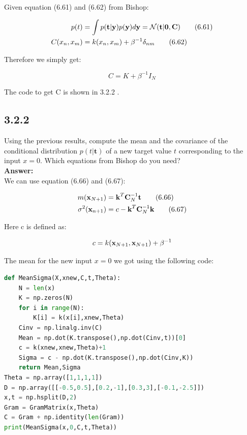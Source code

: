 \documentclass[a4paper]{article}
\begin{document}
Given equation (6.61) and (6.62) from Bishop:

\begin{align}
p(t) &= \int p(\textbf t | \textbf y)p(\textbf y) d \textbf y = \mathcal N (\textbf t| \textbf 0 , \textbf C) \tag{6.61}\\
C(x_n,x_m) &= k(x_n,x_m) + \beta^{-1}\delta_{nm} \tag{6.62}
\end{align}

Therefore we simply get:

\begin{equation}
C = K + \beta^{-1}I_N\label{C}
\end{equation}

The code to get C is shown in 3.2.2 . 



\subsection*{3.2.2}

Using the previous results, compute the mean and the covariance of the conditional distribution $p(t | \textbf{t})$ of a new target value $t$ corresponding to the input $x = 0$. Which equations from Bishop do you need?\\
\textbf{Answer:}\\


We can use equation (6.66) and (6.67):

\begin{align}
m(\textbf x_{N+1}) &=\textbf k^T \textbf C_N^{-1} \textbf t \tag{6.66}\label{666}\\
\sigma^2(\textbf x_{n+1}) &= c-\textbf k^T \textbf C_N^{-1}\textbf k \tag{6.67}
\end{align}

Here c is defined as:

\begin{equation}
c = k(\textbf x_{N+1},\textbf x_{N+1})+\beta^{-1}
\end{equation}

The mean for the new input $x=0$ we got using the following code:

\begin{lstlisting}[language=Python]
def MeanSigma(X,xnew,C,t,Theta):
    N = len(x)
    K = np.zeros(N)
    for i in range(N):
        K[i] = k(x[i],xnew,Theta)
    Cinv = np.linalg.inv(C)
    Mean = np.dot(K.transpose(),np.dot(Cinv,t))[0]
    c = k(xnew,xnew,Theta)+1
    Sigma = c - np.dot(K.transpose(),np.dot(Cinv,K))
    return Mean,Sigma
Theta = np.array([1,1,1,1])
D = np.array([[-0.5,0.5],[0.2,-1],[0.3,3],[-0.1,-2.5]])
x,t = np.hsplit(D,2)
Gram = GramMatrix(x,Theta)
C = Gram + np.identity(len(Gram))
print(MeanSigma(x,0,C,t,Theta))
\end{lstlisting}
\end{document}
